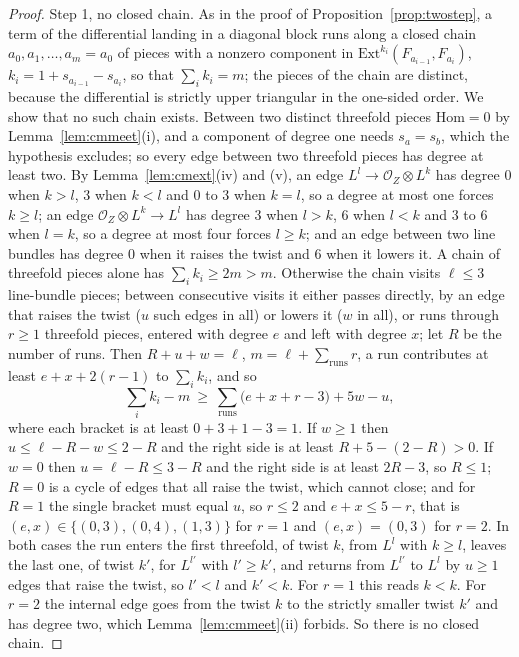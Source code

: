 \documentclass[11pt,reqno]{amsart}
\numberwithin{equation}{section}
\theoremstyle{plain}
\theoremstyle{definition}
\newcommand{\Ext}{\mathrm{Ext}}
\newcommand{\Hom}{\mathrm{Hom}}
\begin{document}
\begin{proof}
Step 1, no closed chain. As in the proof of Proposition~\ref{prop:twostep}, a term of the differential landing in a diagonal block runs along a closed chain $a_{0},a_{1},\dots,a_{m}=a_{0}$ of pieces with a nonzero component in $\Ext^{k_{i}}(F_{a_{i-1}},F_{a_{i}})$, $k_{i}=1+s_{a_{i-1}}-s_{a_{i}}$, so that $\sum_{i}k_{i}=m$; the pieces of the chain are distinct, because the differential is strictly upper triangular in the one-sided order. We show that no such chain exists. Between two distinct threefold pieces $\Hom=0$ by Lemma~\ref{lem:cmmeet}(i), and a component of degree one needs $s_{a}=s_{b}$, which the hypothesis excludes; so every edge between two threefold pieces has degree at least two. By Lemma~\ref{lem:cmext}(iv) and (v), an edge $L^{l}\to\mathcal{O}_{Z}\otimes L^{k}$ has degree $0$ when $k>l$, $3$ when $k<l$ and $0$ to $3$ when $k=l$, so a degree at most one forces $k\ge l$; an edge $\mathcal{O}_{Z}\otimes L^{k}\to L^{l}$ has degree $3$ when $l>k$, $6$ when $l<k$ and $3$ to $6$ when $l=k$, so a degree at most four forces $l\ge k$; and an edge between two line bundles has degree $0$ when it raises the twist and $6$ when it lowers it. A chain of threefold pieces alone has $\sum_{i}k_{i}\ge2m>m$. Otherwise the chain visits $\ell\le3$ line-bundle pieces; between consecutive visits it either passes directly, by an edge that raises the twist ($u$ such edges in all) or lowers it ($w$ in all), or runs through $r\ge1$ threefold pieces, entered with degree $e$ and left with degree $x$; let $R$ be the number of runs. Then $R+u+w=\ell$, $m=\ell+\sum_{\mathrm{runs}}r$, a run contributes at least $e+x+2(r-1)$ to $\sum_{i}k_{i}$, and so
\[
\sum_{i}k_{i}-m\ \ge\ \sum_{\mathrm{runs}}\bigl(e+x+r-3\bigr)+5w-u ,
\]
where each bracket is at least $0+3+1-3=1$. If $w\ge1$ then $u\le\ell-R-w\le2-R$ and the right side is at least $R+5-(2-R)>0$. If $w=0$ then $u=\ell-R\le3-R$ and the right side is at least $2R-3$, so $R\le1$; $R=0$ is a cycle of edges that all raise the twist, which cannot close; and for $R=1$ the single bracket must equal $u$, so $r\le2$ and $e+x\le5-r$, that is $(e,x)\in\{(0,3),(0,4),(1,3)\}$ for $r=1$ and $(e,x)=(0,3)$ for $r=2$. In both cases the run enters the first threefold, of twist $k$, from $L^{l}$ with $k\ge l$, leaves the last one, of twist $k'$, for $L^{l'}$ with $l'\ge k'$, and returns from $L^{l'}$ to $L^{l}$ by $u\ge1$ edges that raise the twist, so $l'<l$ and $k'<k$. For $r=1$ this reads $k<k$. For $r=2$ the internal edge goes from the twist $k$ to the strictly smaller twist $k'$ and has degree two, which Lemma~\ref{lem:cmmeet}(ii) forbids. So there is no closed chain.


\end{proof}
\end{document}
